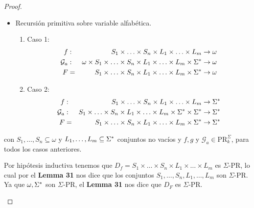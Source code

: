 \begin{proof}
\begin{enumerate}
\begin{itemize}
          \item Recursión primitiva sobre variable alfabética.
          \begin{enumerate}
            \item Caso 1:
            \begin{eqnarray*}
              f &:& S_{1} \times \dotsc \times S_{n} \times L_{1} \times \dotsc \times L_{m} \rightarrow \omega \\
              \mathcal{G}_{a} &:& \omega \times S_{1} \times \dotsc \times S_{n} \times L_{1} \times \dotsc \times L_{m}
                \times \Sigma^{\ast} \rightarrow \omega \\
              F &=& S_{1} \times \dotsc \times S_{n} \times L_{1} \times \dotsc \times L_{m} \times \Sigma^{\ast} \rightarrow
                \omega
            \end{eqnarray*}
            \item Caso 2:
            \begin{eqnarray*}
              f &:& S_{1} \times \dotsc \times S_{n} \times L_{1} \times \dotsc \times L_{m} \rightarrow \Sigma^{\ast} \\
              \mathcal{G}_{a} &:& S_{1} \times \dotsc \times S_{n} \times L_{1} \times \dotsc \times L_{m} \times \Sigma^{\ast}
                \times \Sigma^{\ast} \rightarrow \Sigma^{\ast} \\
              F &=& S_{1} \times \dotsc \times S_{n} \times L_{1} \times \dotsc \times L_{m} \times \Sigma^{\ast} \rightarrow
                \Sigma^{\ast}
            \end{eqnarray*}
          \end{enumerate}
        \end{itemize}

        \PN con $S_{1}, \dotsc, S_{n} \subseteq \omega$ y $L_{1}, \dotsc, L_{m} \subseteq \Sigma^{\ast}$ conjuntos no vacíos
        y $f, g$ y $\mathcal{G}_{a} \in \mathrm{PR}_{k}^{\Sigma}$, para todos los casos anteriores.

        \PN Por hipótesis inductiva tenemos que $D_{f} = S_{1} \times \dotsc \times S_{n} \times L_{1} \times \dotsc
        \times L_{m}$ es $\Sigma$-PR, lo cual por el \textbf{Lemma 31} nos dice que los conjuntos $S_{1}, \dotsc, S_{n},
        L_{1}, \dotsc, L_{m}$ son $\Sigma$-PR. Ya que $\omega, \Sigma^{\ast}$ son $\Sigma$-PR, el \textbf{Lemma 31} nos dice
        que $D_{F}$ es $\Sigma$-PR.


\end{enumerate}
\end{proof}
